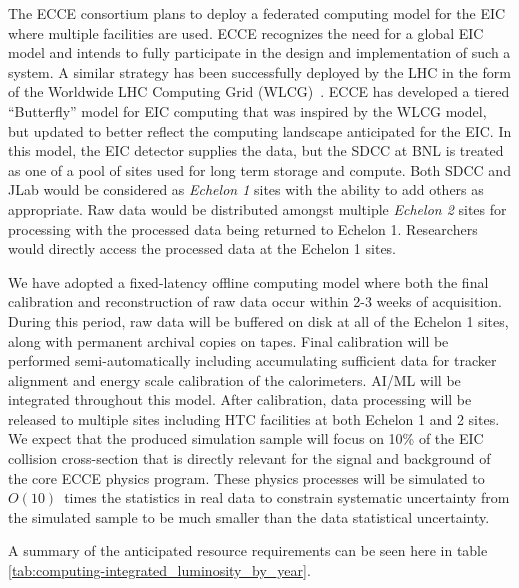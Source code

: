 

The ECCE consortium plans to deploy a federated computing model for the EIC where multiple facilities are used. ECCE recognizes the need for a global EIC model and intends to fully participate in the design and implementation of such a system. A similar strategy has been successfully deployed by the LHC in the form of the Worldwide LHC Computing Grid (WLCG)~\cite{SHIERS2007219}. ECCE has developed a tiered ``Butterfly'' model for EIC computing that was inspired by the WLCG model, but updated to better reflect the computing landscape anticipated for the EIC. In this model, the EIC detector supplies the data, but the SDCC at BNL is treated as one of a pool of sites used for long term storage and compute. Both SDCC and JLab would be considered as \emph{Echelon 1} sites with the ability to add others as appropriate. Raw data would be distributed amongst multiple \emph{Echelon 2} sites for processing with the processed data being returned to Echelon 1. Researchers would directly access the processed data at the Echelon 1 sites.

We have adopted a fixed-latency offline computing model where both the final calibration and reconstruction of raw data occur within 2-3 weeks of acquisition. During this period, raw data will be buffered on disk at all of the Echelon 1 sites, along with permanent archival copies on tapes. Final calibration will be performed semi-automatically including accumulating sufficient data for tracker alignment and energy scale calibration of the calorimeters. AI/ML will be integrated throughout this model. After calibration, data processing  will be released to multiple sites including HTC facilities at both Echelon 1 and 2 sites. We expect that the produced simulation sample will focus on 10\% of the EIC collision cross-section that is directly relevant for the signal and background of the core ECCE physics program. These physics processes will be simulated to $O(10)$~times the statistics in real data to constrain systematic uncertainty from the simulated sample to be much smaller than the data statistical uncertainty.

A summary of the anticipated resource requirements can be seen here in table \ref{tab:computing-integrated_luminosity_by_year}.


